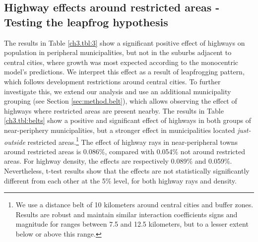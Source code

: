 \documentclass[a4paper,authoryear,review]{elsarticle}  	%
\begin{document}

\subsection{Highway effects around restricted areas - Testing the leapfrog hypothesis}
	The results in Table \ref{ch3.tbl:3} show a significant positive effect of highways on population in peripheral municipalities, but not in the suburbs adjacent to central cities, where growth was most expected according to the monocentric model's predictions. 
	We interpret this effect as a result of leapfrogging pattern, which follows development restrictions around central cities. To further investigate this, we extend our analysis and use an additional municipality grouping (see Section \ref{sec:method.belt}), which allows observing the effect of highways where restricted areas are present nearby. The results in Table \ref{ch3.tbl:belts} show a positive and significant effect of highways in both groups of near-periphery municipalities, but a stronger effect in municipalities located \textit{just-outside} restricted areas.\footnote{We use a distance belt of 10 kilometers around central cities and buffer zones. Results are robust and maintain similar interaction coefficients signs and magnitude for ranges between 7.5 and 12.5 kilometers, but to a lesser extent below or above this range.} 
	The effect of highway rays in near-peripheral towns around restricted areas is 0.086\%, compared with 0.054\% not around restricted areas. For highway density, the effects are respectively 0.089\% and 0.059\%. Nevertheless, t-test results show that the effects are not statistically significantly different from each other at the 5\% level, for both highway rays and density.
\end{document}
